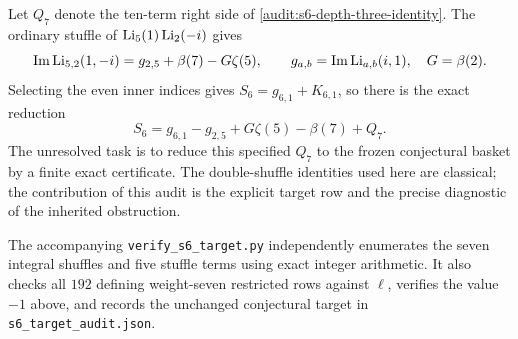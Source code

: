 Let $Q_7$ denote the ten-term right side of
\eqref{audit:s6-depth-three-identity}. The ordinary stuffle of
$\operatorname{Li}_5(1)\operatorname{Li}_2(-i)$ gives
\[
 \operatorname{Im}\operatorname{Li}_{5,2}(1,-i)
 =g_{2,5}+\beta(7)-G\zeta(5),
 \qquad g_{a,b}=\operatorname{Im}\operatorname{Li}_{a,b}(i,1),\quad G=\beta(2).
\]
Selecting the even inner indices gives
$S_6=g_{6,1}+K_{6,1}$, so there is the exact reduction
\begin{equation}
 S_6=g_{6,1}-g_{2,5}+G\zeta(5)-\beta(7)+Q_7.
 \label{audit:s6-Q-reduction}
\end{equation}
The unresolved task is to reduce this specified $Q_7$ to the frozen
conjectural basket by a finite exact certificate. The double-shuffle
identities used here are classical; the contribution of this audit is
the explicit target row and the precise diagnostic of the inherited
obstruction.

The accompanying \texttt{verify\_s6\_target.py} independently enumerates
the seven integral shuffles and five stuffle terms using exact integer
arithmetic. It also checks all $192$ defining weight-seven restricted
rows against $\ell$, verifies the value $-1$ above, and records the
unchanged conjectural target in \texttt{s6\_target\_audit.json}.
